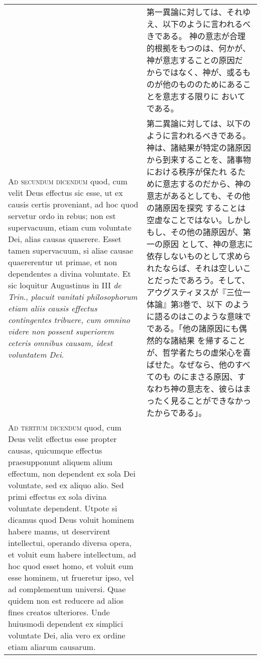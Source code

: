 \documentclass[10pt]{jsarticle} %
\begin{document}
\begin{longtable}{p{21em}p{21em}}
&

第一異論に対しては、それゆえ、以下のように言われるべきである。
神の意志が合理的根拠をもつのは、何かが、神が意志することの原因だ
 からではなく、神が、或るものが他のもののためにあることを意志する限りに
 おいてである。


\\


{\scshape Ad secundum dicendum} quod, cum velit Deus
effectus sic esse, ut ex causis certis proveniant, ad hoc quod servetur
ordo in rebus; non est supervacuum, etiam cum voluntate Dei, alias
causas quaerere. Esset tamen supervacuum, si aliae causae quaererentur
ut primae, et non dependentes a divina voluntate. Et sic loquitur
Augustinus in III {\itshape de Trin}., {\itshape placuit vanitati philosophorum etiam aliis
causis effectus contingentes tribuere, cum omnino videre non possent
superiorem ceteris omnibus causam, idest voluntatem Dei}.


&

第二異論に対しては、以下のように言われるべきである。
神は、諸結果が特定の諸原因から到来することを、諸事物における秩序が保たれ
 るために意志するのだから、神の意志があるとしても、その他の諸原因を探究
 することは空虚なことではない。しかしもし、その他の諸原因が、第一の原因
 として、神の意志に依存しないものとして求められたならば、それは空しいこ
 とだったであろう。そして、アウグスティヌスが『三位一体論』第3巻で、以下
 のように語るのはこのような意味でである。「他の諸原因にも偶然的な諸結果
 を帰することが、哲学者たちの虚栄心を喜ばせた。なぜなら、他のすべてのも
 のにまさる原因、すなわち神の意志を、彼らはまったく見ることができなかっ
 たからである」。

\\


{\scshape Ad tertium dicendum} quod, cum Deus velit
effectus esse propter causas, quicumque effectus praesupponunt aliquem
alium effectum, non dependent ex sola Dei voluntate, sed ex aliquo
alio. Sed primi effectus ex sola divina voluntate dependent. Utpote si
dicamus quod Deus voluit hominem habere manus, ut deservirent
intellectui, operando diversa opera, et voluit eum habere intellectum,
ad hoc quod esset homo, et voluit eum esse hominem, ut frueretur ipso,
vel ad complementum universi. Quae quidem non est reducere ad alios
fines creatos ulteriores. Unde huiusmodi dependent ex simplici voluntate
Dei, alia vero ex ordine etiam aliarum causarum.


&


\end{longtable}
\end{document}
